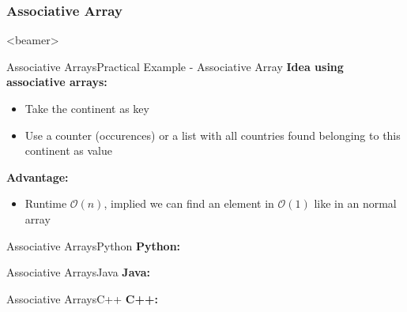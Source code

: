 \subsubsection{Associative Array}

\begin{frame}<beamer>{\LectureToC}
\end{frame}

\begin{frame}{Associative Arrays}{Practical Example - Associative Array}
  \textbf{Idea using associative arrays:}
  \begin{itemize}
    \item
      Take the continent as {\color{Mittel-Blau}key}
    \item
      Use a counter (occurences) or a list with all countries found belonging
      to this continent as {\color{Mittel-Blau}value}
  \end{itemize}
  \textbf{Advantage:}
  \begin{itemize}
    \item
      Runtime $\mathcal{O}(n)$, implied we can find an element in 
      $\mathcal{O}(1)$ like in an normal array
  \end{itemize}
\end{frame}

\begin{frame}{Associative Arrays}{Python}
  \textbf{Python:}
  
\end{frame}


\begin{frame}{Associative Arrays}{Java}
  \vspace{-0.5em}
  \textbf{Java:}
  \vspace{-0.25em}
  
\end{frame}


\begin{frame}{Associative Arrays}{C++}
  \textbf{C++:}
  
\end{frame}


